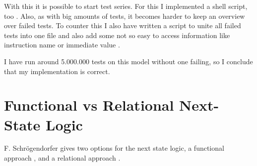 With this it is possible to start test series. For this I implemented a shell
script, too \cite[sh\_utils/test\_btor2\_model.sh]{repoRV2BTOR}. Also, as with
big amounts of tests, it becomes harder to keep an overview over failed tests.
To counter this I also have written a script to unite all failed tests into one
file and also add some not so easy to access information like instruction name
or immediate value \cite[sh\_utils/diff\_logger.sh]{repoRV2BTOR}.

I have run around 5.000.000 tests on this model without one failing, so I
conclude that my implementation is correct.

\section{Functional vs Relational Next-State Logic}\label{sec:funcVSrel}
F. Schrögendorfer gives two options for the next state logic, a functional
approach \cite[Chapter 6]{bmcOfLockless}, and a relational approach
\cite[Chapter 7]{bmcOfLockless}.